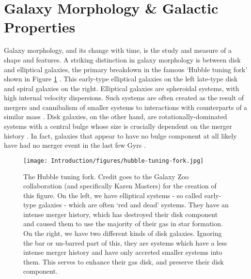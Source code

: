 \section{Galaxy Morphology \& Galactic Properties}\label{galaxy-morphology}
\noindent Galaxy morphology, and its change with time, is the study and measure of a \DIFdelbegin {}\DIFdelend \DIFaddbegin {}\DIFaddend shape and features. A striking distinction in galaxy morphology is between disk and elliptical galaxies, the primary breakdown in the famous `Hubble tuning fork' shown in Figure \ref{fig:hubble-tuning} \citep{1936rene.book.....H}. This \DIFdelbegin {}\DIFdelend \DIFaddbegin {}\DIFaddend early-type elliptical galaxies on the left \DIFdelbegin {}\DIFdelend \DIFaddbegin {}\DIFaddend late-type disk and spiral galaxies on the right. \DIFdelbegin {}\DIFdelend Elliptical galaxies are spheroidal systems, with high internal velocity dispersions. Such systems are often created as the result of mergers and cannibalism of smaller systems to interactions with counterparts of a similar mass \citep{1996MNRAS.283.1361B, 2006MNRAS.366..499D}. Disk galaxies, on the other hand, are rotationally-dominated systems with a central bulge whose size is crucially dependent on the merger history \citep{1992ApJ...393..484B, 2010ApJ...715..202H, 2017ApJ...837L...8B}. In fact, galaxies that appear to have no bulge component at all likely have had no merger event in the last few Gyrs \citep{2012ApJ...756...26M}.

\begin{figure}
\centering
\texttt{[image: Introduction/figures/hubble-tuning-fork.jpg]}
\caption[The Hubble tuning fork.]{The Hubble tuning fork. Credit goes to the Galaxy Zoo collaboration (and specifically Karen Masters) for the creation of this figure. \DIFdelbeginFL {}\DIFdelendFL On the left, we have elliptical systems - so called early-type galaxies - which are often `red and dead' systems. They have an intense merger history, which has destroyed their disk component and caused them to use the majority of their gas in star formation. On the right, we have two different kinds of disk galaxies. Ignoring the bar or un-barred part of this, they are systems which have a less intense merger history and have only accreted smaller systems into them. This serves to enhance their gas disk, and preserve their disk component.}
\label{fig:hubble-tuning}
\end{figure}


